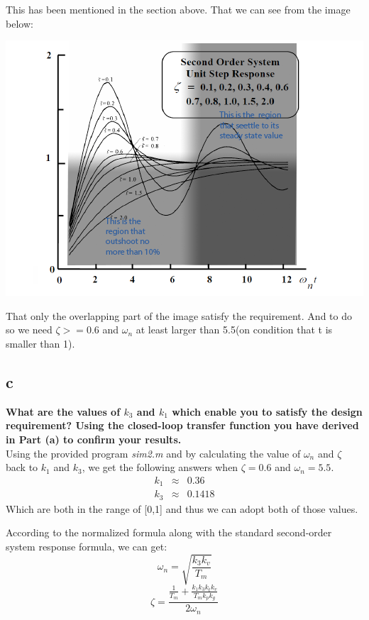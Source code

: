 \documentclass[11pt]{scrartcl}
\begin{document}
This has been mentioned in the section above. That we can see from the image below:

\begin{minipage}[t]{\linewidth}
\label{fig:main}

{
\includegraphics[scale = 1]{vis.png}
}
\end{minipage}
\medskip

That only the overlapping part of the image satisfy the requirement. And to do so we need $\zeta >= 0.6$ and $\omega_n $ at least larger than 5.5(on condition that t is smaller than 1). 

\subsection*{c}
\textbf{What are the values of $k_3$ and $k_1$ which enable you to satisfy the design requirement? Using the closed-loop transfer function you have derived in Part (a) to confirm your results.}\\

Using the provided program \textit{sim2.m} and by calculating the value of $\omega_n$ and $\zeta$ back to $k_1$ and $k_3$, we get the following answers when $\zeta=0.6$ and $\omega_n=5.5$.
\begin{eqnarray*}
k_1&\approx&0.36\\
k_3&\approx& 0.1418
\end{eqnarray*}
Which are both in the range of [0,1] and thus we can adopt both of those values.

According to the normalized formula along with the standard second-order system response formula, we can get:
$$ \omega_n = \sqrt{\frac{k_3k_v}{T_m}}$$
$$\zeta = \frac{\frac{1}{T_m}+\frac{k_1k_3k_tk_v}{T_mk_pk_g}}{2\omega_n}$$
\end{document}
